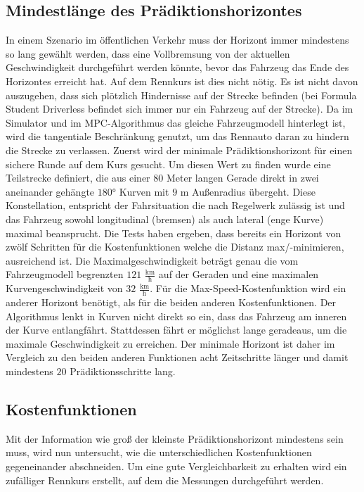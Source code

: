\documentclass{like}
\begin{document}
\subsection{Mindestlänge des Prädiktionshorizontes} 
In einem Szenario im öffentlichen Verkehr muss der Horizont immer mindestens so lang gewählt werden, dass eine Vollbremsung von der aktuellen Geschwindigkeit durchgeführt werden könnte, bevor das Fahrzeug das Ende des Horizontes erreicht hat. Auf dem Rennkurs ist dies nicht nötig. Es ist nicht davon auszugehen, dass sich plötzlich Hindernisse auf der Strecke befinden (bei Formula Student Driverless befindet sich immer nur ein Fahrzeug auf der Strecke). Da im Simulator und im \ac{MPC}-Algorithmus das gleiche Fahrzeugmodell hinterlegt ist, wird die tangentiale Beschränkung genutzt, um das Rennauto daran zu hindern die Strecke zu verlassen.
Zuerst wird der minimale Prädiktionshorizont für einen sichere Runde auf dem Kurs gesucht. Um diesen Wert zu finden wurde eine Teilstrecke definiert, die aus einer $80$ Meter langen Gerade direkt in zwei aneinander gehängte $180$° Kurven mit $9$ m Außenradius übergeht. Diese Konstellation, entspricht der Fahrsituation die nach Regelwerk zulässig ist und das Fahrzeug sowohl longitudinal (bremsen) als auch lateral (enge Kurve) maximal beansprucht. Die Tests haben ergeben, dass bereits ein Horizont von zwölf Schritten für die Kostenfunktionen welche die Distanz max/-minimieren, ausreichend ist. Die Maximalgeschwindigkeit beträgt genau die vom Fahrzeugmodell begrenzten $121$ $\frac{\text{km}}{\text{h}}$ auf der Geraden und eine maximalen Kurven\-ge\-schwin\-dig\-keit von $32$ $\frac{\text{km}}{\text{h}}$. 
Für die Max-Speed-Kostenfunktion wird ein anderer Horizont benötigt, als für die beiden anderen Kostenfunktionen. Der Algorithmus lenkt in Kurven nicht direkt so ein, dass das Fahrzeug am inneren der Kurve entlangfährt. Stattdessen fährt er möglichst lange geradeaus, um die maximale Geschwindigkeit zu erreichen. Der minimale Horizont ist daher im Vergleich zu den beiden anderen Funktionen acht Zeitschritte länger und damit mindestens $20$ Prädiktionsschritte lang.


\subsection{Kostenfunktionen}
Mit der Information wie groß der kleinste Prädiktionshorizont mindestens sein muss, wird nun untersucht, wie die unterschiedlichen Kostenfunktionen gegeneinander abschneiden. Um eine gute Vergleichbarkeit zu erhalten wird ein zufälliger Rennkurs erstellt, auf dem die Messungen durchgeführt werden. 
\end{document}
